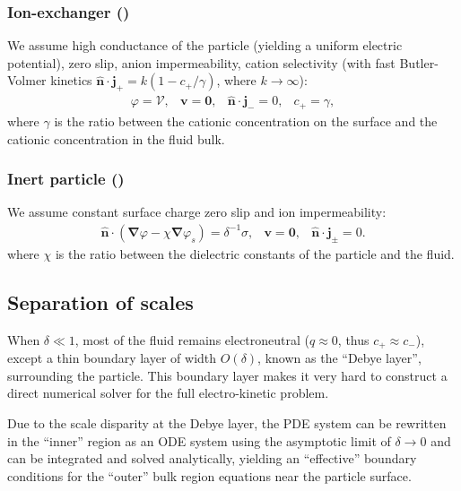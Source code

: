 \documentclass[10pt]{ijnam}
\newcommand\bnabla{\boldsymbol{\nabla}}
\newcommand\bv{\boldsymbol{v}}
\newcommand\bn{\boldsymbol{\hat{n}}}
\newcommand\bj{\boldsymbol{j}}
\newcommand\bzero{\boldsymbol{0}}
\newcommand\cV{\mathscr{V}}
\begin{document}
\subsubsection{Ion-exchanger (\cite{yariv2010migration})}
We assume high conductance of the particle (yielding a uniform electric potential),
zero slip, anion impermeability, cation selectivity 
(with fast Butler-Volmer\cite{bard2000book} kinetics
$\bn \cdot \bj_+ = k (1 - c_+/\gamma)$, where $k \rightarrow \infty$):
\begin{equation}
\begin{array}{cccc}
\varphi = \cV, &
\bv = \bzero, &
\bn \cdot \bj_- = 0, &
c_+ = \gamma,
\end{array}
\end{equation}
where $\gamma$ is the ratio between the cationic concentration on the surface and the cationic
concentration in the fluid bulk.

\subsubsection{Inert particle (\cite{schnitzer2012surface})}
We assume constant surface charge
zero slip and ion impermeability:
\begin{equation}
\begin{array}{cccc}
\bn \cdot (\bnabla \varphi - \chi \bnabla \varphi_s) = \delta^{-1} \sigma, &
\bv = \bzero, &
\bn \cdot \bj_\pm = 0.
\end{array}
\end{equation}
where $\chi$ is the ratio between the dielectric constants of the 
particle and the fluid.

\subsection{Separation of scales}
When $\delta \ll 1$, 
most of the fluid remains electroneutral ($q \approx 0$, thus $c_+ \approx c_-$), 
except a thin boundary layer of width $O(\delta)$, 
known as the ``Debye layer'', surrounding the particle.
This boundary layer makes it very hard to construct 
a direct numerical solver for the full electro-kinetic problem.

Due to the scale disparity at the Debye layer, 
the PDE system can be rewritten in the ``inner'' region 
as an ODE system using the asymptotic limit of $\delta \rightarrow 0$ 
and can be integrated and solved analytically,
yielding an ``effective'' boundary conditions for the ``outer'' bulk region equations near
the particle surface.
\end{document}
